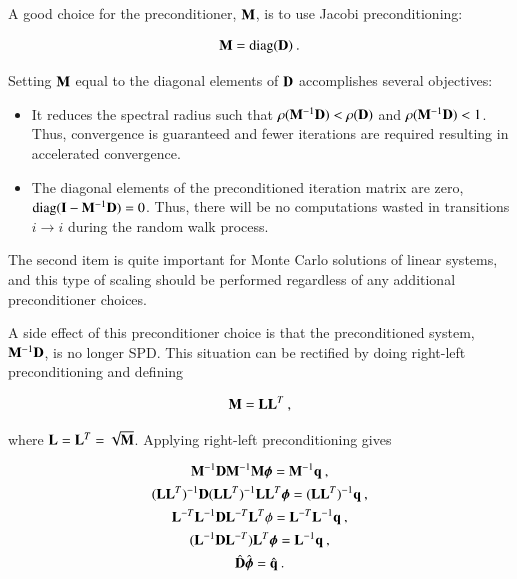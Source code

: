 \documentclass[preprint,12pt]{elsarticle}
\newcommand{\vI}{\ensuremath{\ve{I}}}
\newcommand{\bphi}{\ensuremath{\boldsymbol{\phi}}}
\DeclareMathOperator{\diag}{diag}
\begin{document}
A good choice for the preconditioner, $\mathbf{M}$, is to use Jacobi
preconditioning:

\begin{equation}
  \ve{M}=\diag(\ve{D})\:.
  \label{eq:preconditioner}
\end{equation}

Setting $\mathbf{M}$ equal to the diagonal elements of $\mathbf{D}$
accomplishes several objectives:

\begin{itemize}
\item It reduces the spectral radius such that
  $\rho(\mathbf{M}^{-1}\mathbf{D}) < \rho(\mathbf{D})$ and
  $\rho(\mathbf{M}^{-1}\mathbf{D}) < 1$.  Thus, convergence is guaranteed and
  fewer iterations are required resulting in accelerated convergence.
\item The diagonal elements of the preconditioned iteration matrix are
  zero, $\diag(\vI - \ve{M}^{-1}\ve{D}) = 0$.  Thus, there will be no
  computations wasted in transitions $i\rightarrow i$ during the
  random walk process.
\end{itemize}

The second item is quite important for Monte Carlo solutions of linear
systems, and this type of scaling should be performed regardless of
any additional preconditioner choices.  

A side effect of this preconditioner choice is that the preconditioned
system, $\mathbf{M}^{-1}\mathbf{D}$, is no longer SPD.  This situation can be
rectified by doing right-left preconditioning and defining

\begin{equation}
  \mathbf{M} = \mathbf{L}\mathbf{L}^{T}\:,
\end{equation}

where $\mathbf{L} = \mathbf{L}^{T} = \sqrt{\mathbf{M}}$.  Applying right-left
preconditioning gives

\begin{equation}
  \begin{gathered}
    \ve{M}^{-1}\ve{D}\ve{M}^{-1}\ve{M}\bphi = \ve{M}^{-1}\ve{q}\:,\\
    (\ve{LL}^T)^{-1}\ve{D}(\ve{LL}^T)^{-1}\ve{LL}^T\bphi =
    (\ve{LL}^T)^{-1}\ve{q}\:, \\
    \ve{L}^{-T}\ve{L}^{-1}\ve{D}\ve{L}^{-T}\ve{L}^T\phi =
    \ve{L}^{-T}\ve{L}^{-1}\ve{q}\:,\\ 
    (\ve{L}^{-1}\ve{D}\ve{L}^{-T})\ve{L}^T\bphi = \ve{L}^{-1}\ve{q}\:,\\
    \hat{\ve{D}}\hat{\bphi} = \hat{\ve{q}}\:.
  \end{gathered}
  \label{eq:right-left-preconditioning}
\end{equation}
\end{document}
